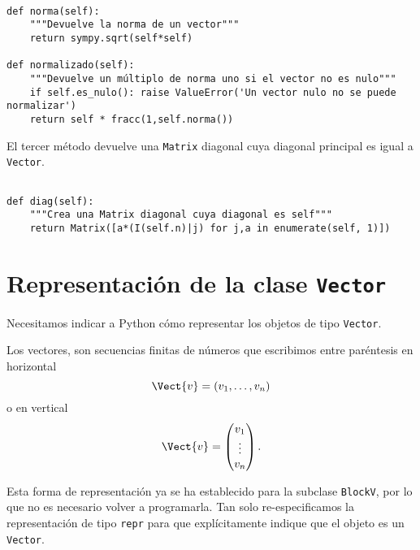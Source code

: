 \documentclass[11pt]{report}
\begin{document}
\begin{verbatim}

def norma(self):
    """Devuelve la norma de un vector"""
    return sympy.sqrt(self*self)
                                                               
def normalizado(self):
    """Devuelve un múltiplo de norma uno si el vector no es nulo"""
    if self.es_nulo(): raise ValueError('Un vector nulo no se puede normalizar')
    return self * fracc(1,self.norma())

\end{verbatim}

El tercer método devuelve una \texttt{Matrix} diagonal cuya diagonal
principal es igual a \texttt{Vector}.

\begin{verbatim}

def diag(self):
    """Crea una Matrix diagonal cuya diagonal es self"""
    return Matrix([a*(I(self.n)|j) for j,a in enumerate(self, 1)])

\end{verbatim}

\section{Representación de la clase \texttt{Vector}}
\label{sec:orgdcab3a7}

Necesitamos indicar a Python cómo representar los objetos de tipo
\texttt{Vector}.

Los vectores, son secuencias finitas de números que escribimos entre
paréntesis en horizontal
\begin{displaymath}
  \Vect{v}=(v_1,\ldots,v_n)
\end{displaymath}
o en vertical
\begin{displaymath}
  \Vect{v}=\begin{pmatrix}v_1\\ \vdots \\ v_n\end{pmatrix}.
\end{displaymath}

Esta forma de representación ya se ha establecido para la subclase
\texttt{BlockV}, por lo que no es necesario volver a programarla. Tan solo
re-especificamos la representación de tipo \texttt{repr} para que
explícitamente indique que el objeto es un \texttt{Vector}.
\end{document}
